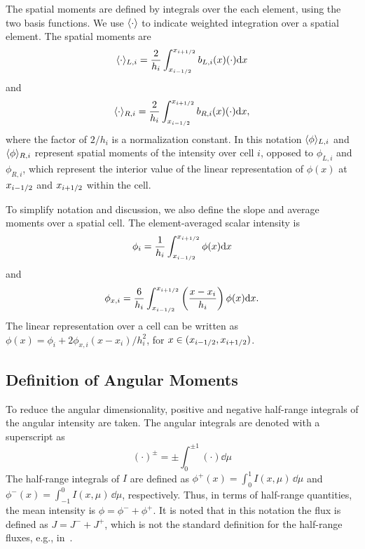 The spatial moments are defined by integrals over the each element, using the two
basis functions.  We use $\langle \cdot \rangle$ to indicate weighted integration over a
spatial element.  The spatial moments are
\begin{equation}\label{eq:x_moml}
\langle \cdot \rangle_{L,i} = \frac{2}{h_i} \int_{x_{i-1/2}}^{{x_{i+1/2}}} b_{L,i}(x) (\cdot) \mathrm{d} x
\end{equation}
and
\begin{equation}\label{eq:x_momr}
\langle \cdot \rangle_{R,i} = \frac{2}{h_i} \int_{x_{i-1/2}}^{{x_{i+1/2}}} b_{R,i}(x) (\cdot) \mathrm{d} x,
\end{equation}
where the factor of $2/h_i$ is a normalization constant.
In this notation $\langle \phi \rangle_{L,i}$ and
$\langle \phi \rangle_{R,i}$ represent spatial moments of the intensity over cell $i$, opposed
to $\phi_{L,i}$ and $\phi_{R,i}$, which represent the interior value of the linear
representation of $\phi(x)$ at $x_{{i-1/2}}$ and $x_{{i+1/2}}$ within the cell. 

To simplify notation and discussion, we also define the slope and average moments over a
spatial cell.  The element-averaged scalar intensity is
\begin{equation}
    \phi_i = \frac{1}{h_i} \int_{{x_{i-1/2}}}^{{x_{i+1/2}}} \phi(x) \mathrm{d} x
\end{equation}
and
\begin{equation}
    \phi_{x,i} = \frac{6}{h_i} \int_{{x_{i-1/2}}}^{{x_{i+1/2}}} \left(\frac{x-x_i}{h_i} \right)
    \phi(x) \mathrm{d} x . 
\end{equation}
The linear representation over a cell can be written as $\phi(x) = \phi_i
+ 2\phi_{x,i}(x - x_i)/h_i^2$, for $x\in({x_{i-1/2}},{x_{i+1/2}})$. 

\subsection{Definition of Angular Moments}

To reduce the angular dimensionality, positive and
negative half-range integrals of the angular intensity are taken.  The angular integrals
are denoted with a superscript as
\begin{equation}
    (\cdot)^\pm =  \pm\int_0^{\pm1} (\cdot) \dd \mu
\end{equation}
The half-range
integrals of $I$ are defined as $ \phi^+(x) = \int_0^{1} I(x,\mu)\, \dd \mu$ and $
\phi^-(x) =  \int_{-1}^{0} I(x,\mu) \,\dd
\mu$, respectively.  Thus, in terms of half-range quantities, the mean intensity is $\phi = \phi^- +
\phi ^+$.  It is noted that in this notation the flux is defined as
$J=J^-+J^+$, which is not the standard definition for the half-range fluxes, e.g.,
in~\cite{lewis}.

